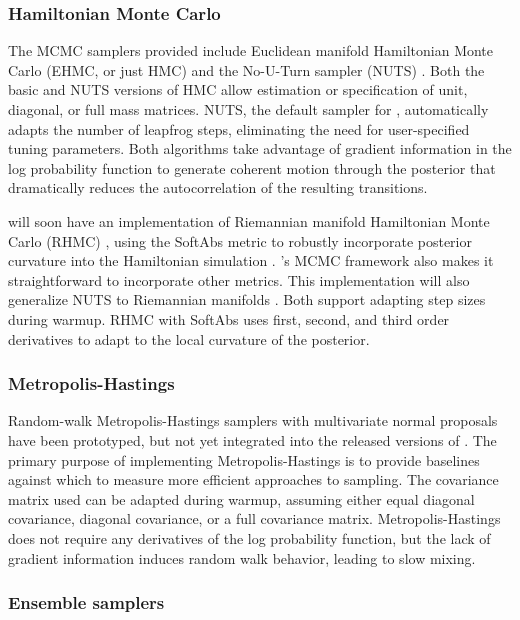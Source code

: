 \documentclass[article]{jss}
\begin{document}
\subsubsection{Hamiltonian Monte Carlo}

The MCMC samplers provided include Euclidean manifold Hamiltonian
Monte Carlo (EHMC, or just HMC) \citep{DuaneEtAl:1987, Neal:1994,
  Neal:2011} and the No-U-Turn sampler (NUTS)
\citep{HoffmanGelman:2011}.  Both the basic and NUTS versions of HMC
allow estimation or specification of unit, diagonal, or full mass
matrices.  NUTS, the default sampler for ,
automatically adapts the number of leapfrog steps, eliminating the
need for user-specified tuning parameters.  Both algorithms take
advantage of gradient information in the log probability function to
generate coherent motion through the posterior that dramatically
reduces the autocorrelation of the resulting transitions.

 will soon have an implementation of Riemannian
manifold Hamiltonian Monte Carlo (RHMC)
\citep{GirolamiCalderhead:2011}, using the SoftAbs metric to robustly
incorporate posterior curvature into the Hamiltonian simulation
\cite{Betancourt:2012}.  's MCMC framework also makes
it straightforward to incorporate other metrics.  This implementation
will also generalize NUTS to Riemannian manifolds
\citep{Betancourt:2013}.  Both support adapting step sizes during
warmup.  RHMC with SoftAbs uses first, second, and third order
derivatives to adapt to the local curvature of the posterior.

\subsubsection{Metropolis-Hastings}

Random-walk Metropolis-Hastings samplers with multivariate normal
proposals have been prototyped, but not yet integrated into the
released versions of .  The primary purpose of
implementing Metropolis-Hastings is to provide baselines against which
to measure more efficient approaches to sampling.  The covariance
matrix used can be adapted during warmup, assuming either equal
diagonal covariance, diagonal covariance, or a full covariance matrix.
Metropolis-Hastings does not require any derivatives of the log
probability function, but the lack of gradient information induces
random walk behavior, leading to slow mixing.


\subsubsection{Ensemble samplers}
\end{document}
